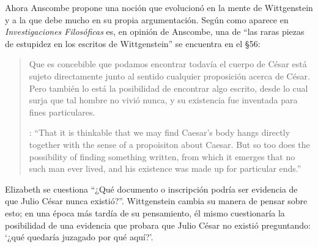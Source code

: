 Ahora Anscombe propone una noción que evolucionó en la mente de Wittgenstein y a la que debe mucho en su propia argumentación. Según como aparece en \emph{Investigaciones Filosóficas} es, en opinión de Anscombe, una de \enquote{las raras piezas de estupidez en los escritos de Wittgenstein} se encuentra en el \S56: \blockquote[{\cite[89]{anscombe1981parmenides:humeandjulius}}: \enquote{That it is thinkable that we may find Caesar's body hangs directly together with the sense of a propoisiton about Caesar. But so too does the possibility of finding something written, from which it emerges that no such man ever lived, and his existence was made up for particular ends.}]{Que es concebible que podamos encontrar todavía el cuerpo de César está sujeto directamente junto al sentido cualquier proposición acerca de César. Pero también lo está la posibilidad de encontrar algo escrito, desde lo cual surja que tal hombre no vivió nunca, y su existencia fue inventada para fines particulares.} Elizabeth se cuestiona \enquote{¿Qué documento o inscripción podría ser evidencia de que Julio César nunca existió?}. Wittgenstein cambia su manera de pensar sobre esto; en una época más tardía de su pensamiento, él mismo cuestionaría la posibilidad de una evidencia que probara que Julio César no existió preguntando: \enquote*{¿qué quedaría juzagado por qué aquí?}.

